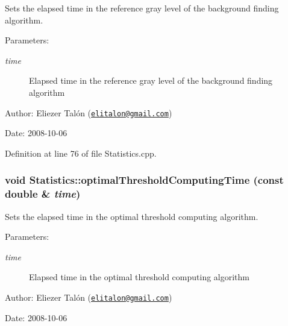 Sets the elapsed time in the reference gray level of the background finding algorithm. 

\begin{Desc}
\item[Parameters:]
\begin{description}
\item[{\em time}]Elapsed time in the reference gray level of the background finding algorithm\end{description}
\end{Desc}
\begin{Desc}
\item[Author:]Eliezer Talón (\href{mailto:elitalon@gmail.com}{\tt elitalon@gmail.com}) \end{Desc}
\begin{Desc}
\item[Date:]2008-10-06 \end{Desc}


Definition at line 76 of file Statistics.cpp.\hypertarget{class_statistics_eed35a930f29f4596f3715306e1e1dbc}{
\subsubsection[optimalThresholdComputingTime]{\setlength{\rightskip}{0pt plus 5cm}void Statistics::optimalThresholdComputingTime (const double \& {\em time})}}
\label{class_statistics_eed35a930f29f4596f3715306e1e1dbc}


Sets the elapsed time in the optimal threshold computing algorithm. 

\begin{Desc}
\item[Parameters:]
\begin{description}
\item[{\em time}]Elapsed time in the optimal threshold computing algorithm\end{description}
\end{Desc}
\begin{Desc}
\item[Author:]Eliezer Talón (\href{mailto:elitalon@gmail.com}{\tt elitalon@gmail.com}) \end{Desc}
\begin{Desc}
\item[Date:]2008-10-06 \end{Desc}


